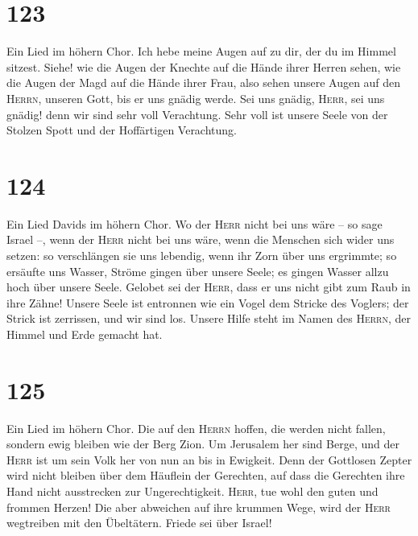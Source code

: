 \hypertarget{section-122}{%
\section{123}\label{section-122}}

 Ein Lied im höhern Chor. Ich hebe meine Augen auf zu dir,
der du im Himmel sitzest.  Siehe! wie die Augen der
Knechte auf die Hände ihrer Herren sehen, wie die Augen der Magd auf die
Hände ihrer Frau, also sehen unsere Augen auf den \textsc{Herrn},
unseren Gott, bis er uns gnädig werde.  Sei uns gnädig,
\textsc{Herr}, sei uns gnädig! denn wir sind sehr voll Verachtung.
 Sehr voll ist unsere Seele von der Stolzen Spott und der
Hoffärtigen Verachtung.

\hypertarget{section-123}{%
\section{124}\label{section-123}}

 Ein Lied Davids im höhern Chor. Wo der \textsc{Herr}
nicht bei uns wäre -- so sage Israel --,  wenn der
\textsc{Herr} nicht bei uns wäre, wenn die Menschen sich wider uns
setzen:  so verschlängen sie uns lebendig, wenn ihr Zorn
über uns ergrimmte;  so ersäufte uns Wasser, Ströme gingen
über unsere Seele;  es gingen Wasser allzu hoch über
unsere Seele.  Gelobet sei der \textsc{Herr}, dass er uns
nicht gibt zum Raub in ihre Zähne!  Unsere Seele ist
entronnen wie ein Vogel dem Stricke des Voglers; der Strick ist
zerrissen, und wir sind los.  Unsere Hilfe steht im Namen
des \textsc{Herrn}, der Himmel und Erde gemacht hat.

\hypertarget{section-124}{%
\section{125}\label{section-124}}

 Ein Lied im höhern Chor. Die auf den \textsc{Herrn}
hoffen, die werden nicht fallen, sondern ewig bleiben wie der Berg Zion.
 Um Jerusalem her sind Berge, und der \textsc{Herr} ist um
sein Volk her von nun an bis in Ewigkeit.  Denn der
Gottlosen Zepter wird nicht bleiben über dem Häuflein der Gerechten, auf
dass die Gerechten ihre Hand nicht ausstrecken zur Ungerechtigkeit.
 \textsc{Herr}, tue wohl den guten und frommen Herzen!
 Die aber abweichen auf ihre krummen Wege, wird der
\textsc{Herr} wegtreiben mit den Übeltätern. Friede sei über Israel!

